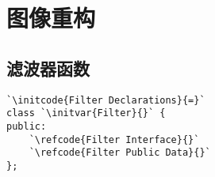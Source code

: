\section{图像重构}\label{sec:图像重构}

\subsection{滤波器函数}\label{sub:滤波器函数}

\begin{lstlisting}
`\initcode{Filter Declarations}{=}`
class `\initvar{Filter}{}` {
public:
    `\refcode{Filter Interface}{}`
    `\refcode{Filter Public Data}{}`
};
\end{lstlisting}